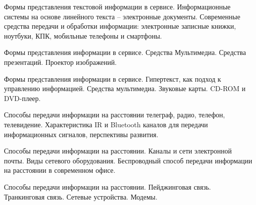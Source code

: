 \documentclass[
	14pt,
	a4paper,
	]
	{scrartcl}
\begin{document}
\shapk
{}
\setcounter{zad}{0}

\vfill
\z Формы представления текстовой информации в сервисе. Информационные системы на основе линейного текста – электронные документы.
 \vfill
\z Современные средства передачи и обработки информации: электронные записные книжки, ноутбуки, КПК, мобильные телефоны и смартфоны.
 \vfill

\vfill

\newpage


\shapk
{}
\setcounter{zad}{0}

\vfill
\z Формы представления информации в сервисе. Средства Мультимедиа.
 \vfill
\z Средства презентаций. Проектор изображений.
 \vfill

\vfill

\newpage


\shapk
{}
\setcounter{zad}{0}

\vfill
\z Формы представления информации в сервисе. Гипертекст, как подход к управлению информацией.
 \vfill
\z Средства мультимедиа. Звуковые карты. CD-ROM и DVD-плеер.
 \vfill

\vfill

\newpage


\shapk
{}
\setcounter{zad}{0}

\vfill
\z Способы передачи информации на расстоянии телеграф, радио, телефон, телевидение.
 \vfill
\z Характеристика IR и Bluetooth каналов для передачи информационных сигналов, перспективы развития.
 \vfill

\vfill

\newpage


\shapk
{}
\setcounter{zad}{0}

\vfill
\z Способы передачи информации на расстоянии. Каналы и сети электронной почты.
 \vfill
\z Виды сетевого оборудования. Беспроводный способ передачи информации на расстоянии в современном офисе.
 \vfill

\vfill

\newpage


\shapk
{}
\setcounter{zad}{0}

\vfill
\z Способы передачи информации на расстоянии. Пейджинговая связь. Транкинговая связь.
 \vfill
\z Сетевые устройства. Модемы.
 \vfill

\vfill

\newpage


\shapk
{}
\setcounter{zad}{0}
\end{document}
